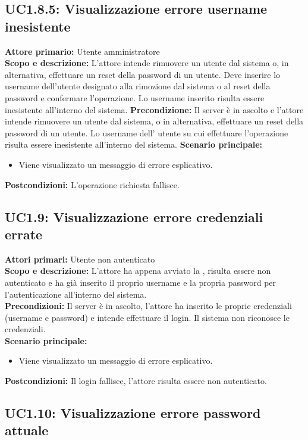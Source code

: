 \documentclass{scalatekids-article}
\begin{document}
\subsection{UC1.8.5: Visualizzazione errore username inesistente}

\textbf{Attore primario:} Utente amministratore\\
\textbf{Scopo e descrizione:} L'attore intende rimuovere un utente dal sistema o, in alternativa, effettuare un reset della password di un utente. Deve inserire lo username dell'utente designato
alla rimozione dal sistema o al reset della password e confermare l'operazione.
Lo username inserito risulta essere inesistente all'interno del sistema.
\textbf{Precondizione:} Il server è in ascolto e l'attore intende rimuovere un utente dal sistema, o in alternativa, effettuare un reset della password di un utente.
Lo username dell' utente su cui effettuare l'operazione risulta essere inesistente all'interno del sistema.
\textbf{Scenario principale:}
\begin{itemize}
\item Viene visualizzato un messaggio di errore esplicativo.
\end{itemize}
\textbf{Postcondizioni:} L'operazione richiesta fallisce.

\subsection{UC1.9: Visualizzazione errore credenziali errate}

\textbf{Attori primari:} Utente non autenticato\\
\textbf{Scopo e descrizione:}
L'attore ha appena avviato la , risulta essere non autenticato e ha già inserito il proprio username e la propria password per l'autenticazione all'interno del sistema.\\
\textbf{Precondizioni:} Il server è in ascolto, l'attore ha inserito le proprie credenziali (username e password) e intende effettuare il login. Il sistema non riconosce le credenziali.\\
\textbf{Scenario principale:}
\begin{itemize}
\item Viene visualizzato un messaggio di errore esplicativo.
\end{itemize}
\textbf{Postcondizioni:} Il login fallisce, l'attore risulta essere non autenticato.

\subsection{UC1.10: Visualizzazione errore password attuale}
\end{document}
